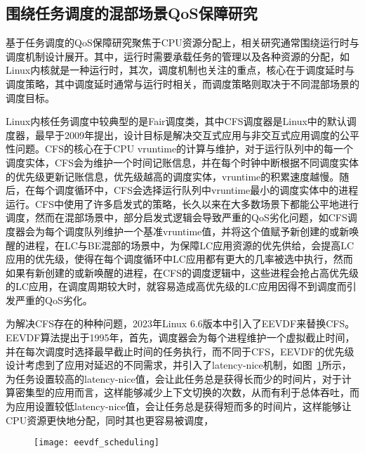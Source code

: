 \subsection{围绕任务调度的混部场景QoS保障研究}


基于任务调度的QoS保障研究聚焦于CPU资源分配上，相关研究通常围绕运行时与调度机制设计展开。其中，运行时需要承载任务的管理以及各种资源的分配，如Linux内核就是一种运行时，其次，调度机制也关注的重点，核心在于调度延时与调度策略，其中调度延时通常与运行时相关，而调度策略则取决于不同混部场景的调度目标。

Linux内核任务调度中较典型的是Fair调度类，其中CFS调度器\citep{pabla2009completely}是Linux中的默认调度器，最早于2009年提出，设计目标是解决交互式应用与非交互式应用调度的公平性问题。CFS的核心在于CPU vruntime的计算与维护，对于运行队列中的每一个调度实体，CFS会为维护一个时间记账信息，并在每个时钟中断根据不同调度实体的优先级更新记账信息，优先级越高的调度实体，vruntime的积累速度越慢。随后，在每个调度循环中，CFS会选择运行队列中vruntime最小的调度实体中的进程运行。CFS中使用了许多启发式的策略，长久以来在大多数场景下都能公平地进行调度，然而在混部场景中，部分启发式逻辑会导致严重的QoS劣化问题，如CFS调度器会为每个调度队列维护一个基准vruntime值，并将这个值赋予新创建的或新唤醒的进程，在LC与BE混部的场景中，为保障LC应用资源的优先供给，会提高LC应用的优先级，使得在每个调度循环中LC应用都有更大的几率被选中执行，然而如果有新创建的或新唤醒的进程，在CFS的调度逻辑中，这些进程会抢占高优先级的LC应用，在调度周期较大时，就容易造成高优先级的LC应用因得不到调度而引发严重的QoS劣化。

为解决CFS存在的种种问题，2023年Linux 6.6版本中引入了EEVDF来替换CFS。EEVDF算法\citep{stoica1995earliest}提出于1995年，首先，调度器会为每个进程维护一个虚拟截止时间，并在每次调度时选择最早截止时间的任务执行，而不同于CFS，EEVDF的优先级设计考虑到了应用对延迟的不同需求，并引入了latency-nice机制，如图~\ref{fig:eevdf_scheduling}所示，为任务设置较高的latency-nice值，会让此任务总是获得长而少的时间片，对于计算密集型的应用而言，这样能够减少上下文切换的次数，从而有利于总体吞吐，而为应用设置较低latency-nice值，会让任务总是获得短而多的时间片，这样能够让CPU资源更快地分配，同时其也更容易被调度，

\begin{figure}[!htbp]
    \centering
    \texttt{[image: eevdf\_scheduling]}
    \label{fig:eevdf_scheduling}
\end{figure}

